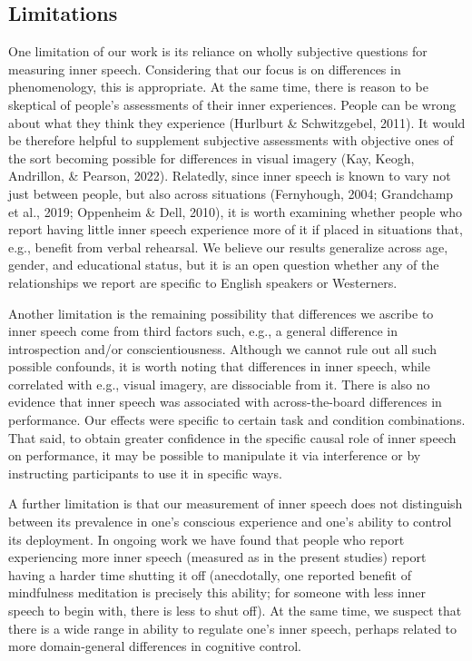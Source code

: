 \documentclass[
  man,a4paper,floatsintext]{apa6}
\begin{document}
\hypertarget{limitations}{%
\subsection{Limitations}\label{limitations}}

One limitation of our work is its reliance on wholly subjective questions for measuring inner speech. Considering that our focus is on differences in phenomenology, this is appropriate. At the same time, there is reason to be skeptical of people's assessments of their inner experiences. People can be wrong about what they think they experience (Hurlburt \& Schwitzgebel, 2011). It would be therefore helpful to supplement subjective assessments with objective ones of the sort becoming possible for differences in visual imagery (Kay, Keogh, Andrillon, \& Pearson, 2022). Relatedly, since inner speech is known to vary not just between people, but also across situations (Fernyhough, 2004; Grandchamp et al., 2019; Oppenheim \& Dell, 2010), it is worth examining whether people who report having little inner speech experience more of it if placed in situations that, e.g., benefit from verbal rehearsal. We believe our results generalize across age, gender, and educational status, but it is an open question whether any of the relationships we report are specific to English speakers or Westerners.

Another limitation is the remaining possibility that differences we ascribe to inner speech come from third factors such, e.g., a general difference in introspection and/or conscientiousness. Although we cannot rule out all such possible confounds, it is worth noting that differences in inner speech, while correlated with e.g., visual imagery, are dissociable from it. There is also no evidence that inner speech was associated with across-the-board differences in performance. Our effects were specific to certain task and condition combinations. That said, to obtain greater confidence in the specific causal role of inner speech on performance, it may be possible to manipulate it via interference or by instructing participants to use it in specific ways.

A further limitation is that our measurement of inner speech does not distinguish between its prevalence in one's conscious experience and one's ability to control its deployment. In ongoing work we have found that people who report experiencing more inner speech (measured as in the present studies) report having a harder time shutting it off (anecdotally, one reported benefit of mindfulness meditation is precisely this ability; for someone with less inner speech to begin with, there is less to shut off). At the same time, we suspect that there is a wide range in ability to regulate one's inner speech, perhaps related to more domain-general differences in cognitive control.
\end{document}
